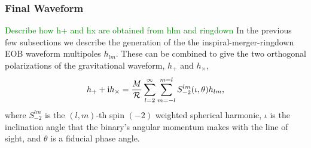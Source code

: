 \documentclass[aps,
prd,
amsmath,
amssymb,
twocolumn,
floatfix,
groupedaddress]{revtex4-1}
\newcommand{\Sum}{\displaystyle\sum\limits}
\newcommand{\ii}{{\rm i}}
\begin{document}
\subsubsection{Final Waveform}\label{sec:level3:FinalWaveform}
\textcolor{green}{Describe how h+ and hx are obtained from hlm and ringdown}
In the previous few subsections we describe the generation of the the inspiral-merger-ringdown EOB waveform multipoles $h_{lm}$. These can be combined to give the two orthogonal polarizations of the gravitational waveform, $h_+$ and $h_{\times}$, 
\begin{equation}
h_+ + \ii h_{\times} = \dfrac{M}{\mathcal{R}} \Sum^{\infty}_{l=2} \Sum^{m=l}_{m = -l} S^{lm}_{-2}(\iota,\theta) h_{lm},
\end{equation}
where $S^{lm}_{-2}$ is the $(l,m)$-th spin $(-2)$ weighted spherical harmonic, $\iota$ is the inclination angle  that the binary's angular momentum makes with the line of sight, and $\theta$ is a fiducial phase angle.


 


\end{document}
